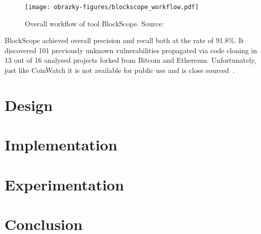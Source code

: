     \begin{figure}[h]
      \centering
      \texttt{[image: obrazky-figures/blockscope\_workflow.pdf]}
      \caption{Overall workflow of tool BlockScope. Source:~\cite{BlockScope}}
      \label{blockscopeworkflow}
    \end{figure}

    BlockScope achieved overall precision and recall both at the rate of 91.8\%. It discovered 101 previously
    unknown vulnerabilities propagated via code cloning in 13 out of 16 analysed projects forked from Bitcoin
    and Ethereum. Unfortunately, just like CoinWatch it is not available for public use and is
    close sourced~\cite{BlockScope}.

\chapter{Design}
\label{chapter:design}


\chapter{Implementation}
\label{chapter:implementation}


\chapter{Experimentation}
\label{chapter:experimentation}


\chapter{Conclusion}
\label{chapter:conclusion}
